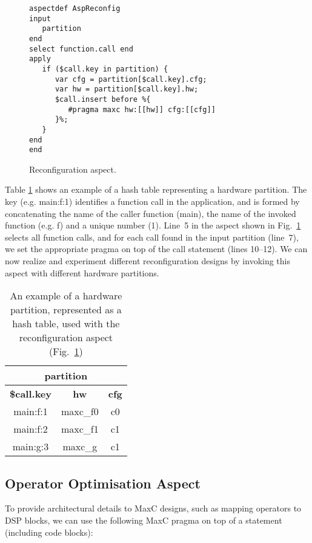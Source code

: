 \lstset{style=lara}
\begin{figure}[!h]
\begin{lstlisting}
aspectdef AspReconfig
input
   partition
end
select function.call end
apply
   if ($call.key in partition) {
      var cfg = partition[$call.key].cfg;
      var hw = partition[$call.key].hw;
      $call.insert before %{
         #pragma maxc hw:[[hw]] cfg:[[cfg]]
      }%;
   }
end
end
\end{lstlisting}
\caption{Reconfiguration aspect.}
\label{fig:aspect-reconf}
\end{figure}

Table \ref{fig:aspect-hash} shows an example of a hash table representing
a hardware partition. The key (e.g. main:f:1) identifies a function call in the application, and is
formed by concatenating the name of the caller function (main), the name of the invoked function (e.g. f) and a
unique number (1).  Line~5 in the aspect shown in Fig.~\ref{fig:aspect-reconf} selects all function calls,
and for each call found in the input partition (line~7), we set the
appropriate pragma on top of the call statement (lines 10--12). We can now realize and experiment
different reconfiguration designs by invoking this aspect with different hardware partitions.


\begin{table}[!h]
\caption{An example of a hardware partition, represented as a hash table, used with the reconfiguration aspect (Fig.~\ref{fig:aspect-reconf})}
\label{fig:aspect-hash}
\centering
\begin{tabular}{c|c|c}
\hline
\multicolumn{3}{c}{\bf{partition}} \\
\hline
\bf{\$call.key} & \bf{hw} & \bf{cfg}  \\
\hline
main:f:1 & maxc\_f0 & c0 \\
main:f:2 & maxc\_f1 & c1 \\
main:g:3 & maxc\_g & c1 \\
\hline
\end{tabular}
\end{table}

\subsection{Operator Optimisation Aspect}
\label{sect:asp_ops}
To provide architectural details to MaxC designs, such as mapping operators to DSP blocks, we can use the following MaxC pragma on top of a statement (including code blocks):


